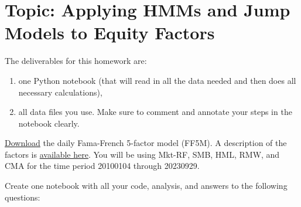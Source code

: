 \documentclass[11pt]{article}
\theoremstyle{plain} %
\theoremstyle{remark}
\begin{document}
\section{Topic: Applying HMMs and Jump Models to Equity Factors}

The deliverables for this homework are: 
\begin{enumerate}
  \item one Python notebook (that will read in all the data needed and then does
  all necessary calculations),
  \item all data files you use. Make sure to comment and annotate your steps in
  the notebook clearly.
\end{enumerate}

\href{https://mba.tuck.dartmouth.edu/pages/faculty/ken.french/ftp/F-F_Research_Data_5_Factors_2x3_daily_CSV.zip}{Download}
the daily Fama-French 5-factor model (FF5M). A description of the factors is
\href{https://mba.tuck.dartmouth.edu/pages/faculty/ken.french/Data_Library/f-f_5_factors_2x3.html}{available
here}. You will be using Mkt-RF, SMB, HML, RMW, and CMA for the time period
20100104 through 20230929.

Create one notebook with all your code, analysis, and answers to the following
questions:
\end{document}
